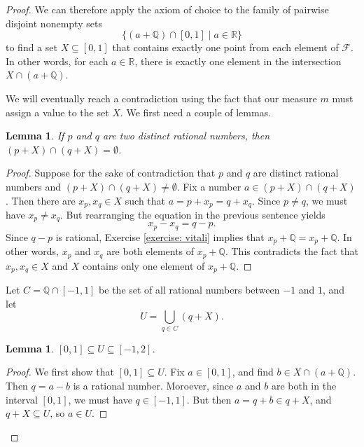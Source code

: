 \documentclass[a4paper]{memoir}
\newtheorem{lemma}[theorem]{Lemma}
\theoremstyle{definition}
\newcommand{\bb}{\mathbb}
\begin{document}
\begin{proof}
  We can therefore apply the axiom of choice to the family of pairwise disjoint nonempty sets 
  \[
    \{(a + \bb{Q}) \cap [0,1] \mid a \in \bb{R}\}
  \] 
  to find a set $X \subseteq [0,1]$ that contains exactly 
  one point from each element of $\mathcal{F}$. In other words, for each $a \in \bb{R}$, there is 
  exactly one element in the intersection $X \cap (a + \bb{Q})$.
  
  We will eventually reach a contradiction using the fact that our measure $m$ must assign a value 
  to the set $X$. We first need a couple of lemmas.
  
  \begin{lemma} \label{lemma: pairwise_disjoint}
    If $p$ and $q$ are two distinct rational numbers, then $(p + X) \cap (q + X) = \emptyset$.
  \end{lemma}
  
  \begin{proof}
    Suppose for the sake of contradiction that $p$ and $q$ are distinct rational numbers 
    and $(p + X) \cap (q + X) \neq \emptyset$. Fix a number $a \in (p + X) \cap (q + X)$. 
    Then there are $x_p, x_q \in X$ such that $a = p + x_p = q + x_q$. Since $p \neq q$, 
    we must have $x_p \neq x_q$. But rearranging the equation in the previous sentence yields 
    \[
      x_p - x_q = q - p.
    \]
    Since $q - p$ is rational, Exercise \ref{exercise: vitali} implies that $x_p + \bb{Q} = 
    x_p + \bb{Q}$. In other words, $x_p$ and $x_q$ are both elements of $x_p + \bb{Q}$. 
    This contradicts the fact that $x_p, x_q \in X$ and $X$ contains only one element of 
    $x_p + \bb{Q}$.
  \end{proof}
  
  Let $C = \bb{Q} \cap [-1,1]$ be the set of all rational numbers between $-1$ and $1$, and 
  let 
  \[
    U = \bigcup_{q \in C} (q + X).
  \]   
  
  \begin{lemma} \label{lemma: sandwich}
    $[0,1] \subseteq U \subseteq [-1,2]$.
  \end{lemma}
  
  \begin{proof}
    We first show that $[0,1] \subseteq U$. Fix $a \in [0,1]$, and find $b \in X \cap (a + \bb{Q})$. 
    Then $q = a - b$ is a rational number. Moroever, since $a$ and $b$ are both in the 
    interval $[0,1]$, we must have $q \in [-1,1]$. But then $a = q + b \in q + X$, and 
    $q + X \subseteq U$, so $a \in U$.
    

\end{proof}
\end{proof}
\end{document}
